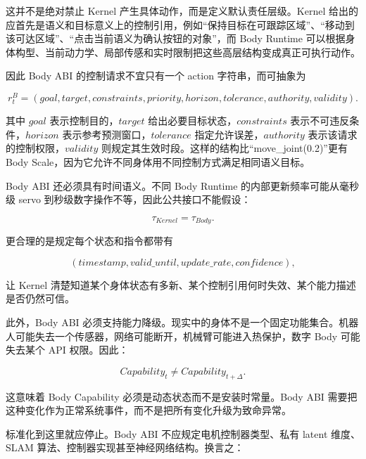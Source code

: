 \begin{statementbox}
\centering
{}
\end{statementbox}

这并不是绝对禁止 Kernel 产生具体动作，而是定义默认责任层级。Kernel 给出的应首先是语义和目标意义上的控制引用，例如``保持目标在可跟踪区域''、``移动到该可达区域''、``点击当前语义为确认按钮的对象''，而 Body Runtime 可以根据身体构型、当前动力学、局部传感和实时限制把这些高层结构变成真正可执行动作。

因此 Body ABI 的控制请求不宜只有一个 action 字符串，而可抽象为

\[
r_t^B=
(
goal,
target,
constraints,
priority,
horizon,
tolerance,
authority,
validity
).
\]

其中 $goal$ 表示控制目的，$target$ 给出必要目标状态，$constraints$ 表示不可违反条件，$horizon$ 表示参考预测窗口，$tolerance$ 指定允许误差，$authority$ 表示该请求的控制权限，$validity$ 则规定其生效时段。这样的结构比``move\_joint(0.2)''更有 Body Scale，因为它允许不同身体用不同控制方式满足相同语义目标。

Body ABI 还必须具有时间语义。不同 Body Runtime 的内部更新频率可能从毫秒级 servo 到秒级数字操作不等，因此公共接口不能假设：

\[
\tau_{Kernel}=\tau_{Body}.
\]

更合理的是规定每个状态和指令都带有

\[
(timestamp,
valid\_until,
update\_rate,
confidence),
\]

让 Kernel 清楚知道某个身体状态有多新、某个控制引用何时失效、某个能力描述是否仍然可信。

此外，Body ABI 必须支持能力降级。现实中的身体不是一个固定功能集合。机器人可能失去一个传感器，网络可能断开，机械臂可能进入热保护，数字 Body 可能失去某个 API 权限。因此：

\[
Capability_t
\neq
Capability_{t+\Delta}.
\]

这意味着 Body Capability 必须是动态状态而不是安装时常量。Body ABI 需要把这种变化作为正常系统事件，而不是把所有变化升级为致命异常。

标准化到这里就应停止。Body ABI 不应规定电机控制器类型、私有 latent 维度、SLAM 算法、控制器实现甚至神经网络结构。换言之：

\begin{statementbox}
\centering
{}
\end{statementbox}

